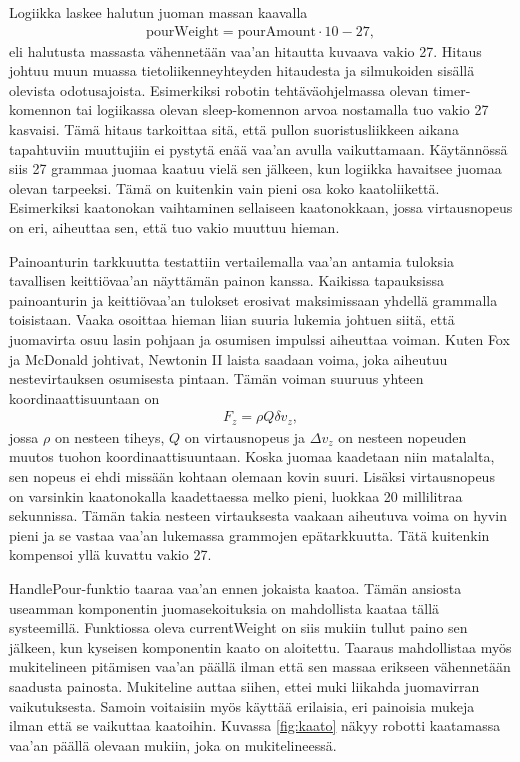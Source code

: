 Logiikka laskee halutun juoman massan kaavalla
\begin{align}
    \mathrm{pourWeight} = \mathrm{pourAmount} \cdot 10 - 27 \mathrm{,}
\end{align}
eli halutusta massasta vähennetään vaa'an hitautta kuvaava vakio 27. Hitaus johtuu muun muassa tietoliikenneyhteyden hitaudesta ja silmukoiden sisällä olevista odotusajoista. Esimerkiksi robotin tehtäväohjelmassa olevan timer-komennon tai logiikassa olevan sleep-komennon arvoa nostamalla tuo vakio 27 kasvaisi. Tämä hitaus tarkoittaa sitä, että pullon suoristusliikkeen aikana tapahtuviin muuttujiin ei pystytä enää vaa'an avulla vaikuttamaan. Käytännössä siis 27 grammaa juomaa kaatuu vielä sen jälkeen, kun logiikka havaitsee juomaa olevan tarpeeksi. Tämä on kuitenkin vain pieni osa koko kaatoliikettä. Esimerkiksi kaatonokan vaihtaminen sellaiseen kaatonokkaan, jossa virtausnopeus on eri, aiheuttaa sen, että tuo vakio muuttuu hieman.

Painoanturin tarkkuutta testattiin vertailemalla vaa'an antamia tuloksia tavallisen keittiövaa'an näyttämän painon kanssa. Kaikissa tapauksissa painoanturin ja keittiövaa'an tulokset erosivat maksimissaan yhdellä grammalla toisistaan. Vaaka osoittaa hieman liian suuria lukemia johtuen siitä, että juomavirta osuu lasin pohjaan ja osumisen impulssi aiheuttaa voiman. Kuten Fox ja McDonald \cite[s.197-198]{Fox2011} johtivat, Newtonin II laista saadaan voima, joka aiheutuu nestevirtauksen osumisesta pintaan. Tämän voiman suuruus yhteen koordinaattisuuntaan on
\begin{align}
    F_z = \rho Q \delta v_z \mathrm{,}
\end{align}
jossa $\rho$ on nesteen tiheys, $Q$ on virtausnopeus ja $\Delta v_z$ on nesteen nopeuden muutos tuohon koordinaattisuuntaan. Koska juomaa kaadetaan niin matalalta, sen nopeus ei ehdi missään kohtaan olemaan kovin suuri. Lisäksi virtausnopeus on varsinkin kaatonokalla kaadettaessa melko pieni, luokkaa 20 millilitraa sekunnissa. Tämän takia nesteen virtauksesta vaakaan aiheutuva
voima on hyvin pieni ja se vastaa vaa'an lukemassa grammojen epätarkkuutta. Tätä kuitenkin kompensoi yllä kuvattu vakio 27.

HandlePour-funktio taaraa vaa'an ennen jokaista kaatoa. Tämän ansiosta useamman komponentin juomasekoituksia on mahdollista kaataa tällä systeemillä. Funktiossa oleva currentWeight on siis mukiin tullut paino sen jälkeen, kun kyseisen komponentin kaato on aloitettu. Taaraus mahdollistaa myös mukitelineen pitämisen vaa'an päällä ilman että sen massaa erikseen vähennetään saadusta painosta. Mukiteline auttaa siihen, ettei muki liikahda juomavirran vaikutuksesta. Samoin voitaisiin myös käyttää erilaisia, eri painoisia mukeja ilman että se vaikuttaa kaatoihin. Kuvassa \ref{fig:kaato} näkyy robotti kaatamassa vaa'an päällä olevaan mukiin, joka on mukitelineessä.

